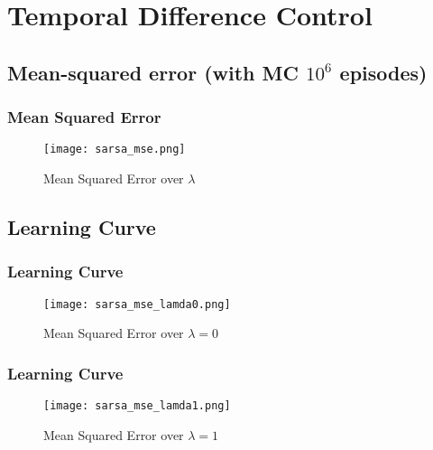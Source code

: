 \documentclass{beamer}
\begin{document}

\section{Temporal Difference Control}
\subsection{Mean-squared error (with MC $10^6$ episodes)}
\begin{frame}
    \frametitle{Mean Squared Error}
    \begin{figure}[!ht]
		\centering
		\texttt{[image: sarsa\_mse.png]}
		\caption{Mean Squared Error over $\lambda$}
	\end{figure}
\end{frame}

\subsection{Learning Curve}

\begin{frame}
    \frametitle{Learning Curve}
    \begin{figure}[!ht]
		\centering
		\texttt{[image: sarsa\_mse\_lamda0.png]}
		\caption{Mean Squared Error over $\lambda=0$}
	\end{figure}
\end{frame}
\begin{frame}
    \frametitle{Learning Curve}
    \begin{figure}[!ht]
		\centering
		\texttt{[image: sarsa\_mse\_lamda1.png]}
		\caption{Mean Squared Error over $\lambda=1$}
	\end{figure}
\end{frame}
\end{document}
